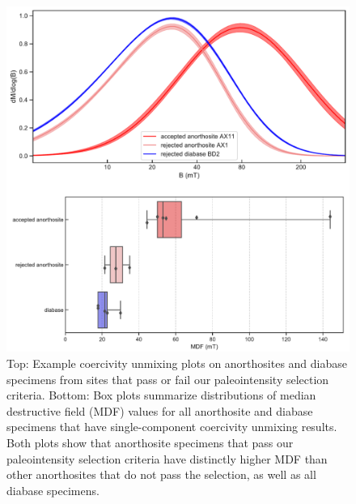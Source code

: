 \documentclass[draft]{agujournal2019}
\begin{document}
\begin{figure}[h!]
\noindent\includegraphics[width=\textwidth]{coercivity.pdf}
\centering
\caption{\footnotesize{Top: Example coercivity unmixing plots on anorthosites and diabase specimens from sites that pass or fail our paleointensity selection criteria. Bottom: Box plots summarize distributions of median destructive field (MDF) values for all anorthosite and diabase specimens that have single-component coercivity unmixing results. Both plots show that anorthosite specimens that pass our paleointensity selection criteria have distinctly higher MDF than other anorthosites that do not pass the selection, as well as all diabase specimens.}}
\label{fig:coercivity}
\end{figure}
\end{document}
